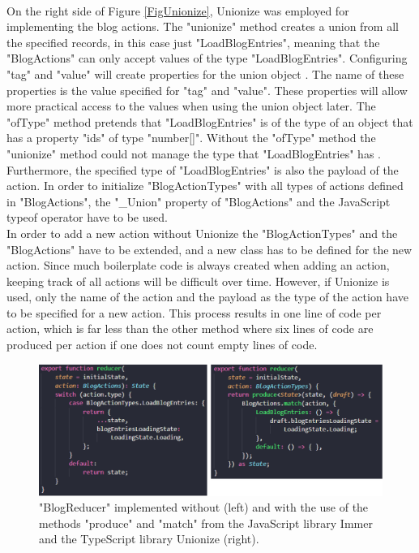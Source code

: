 \documentclass[Bachelor,BIF,english]{twbook}
\begin{document}
\\[\baselineskip]
On the right side of Figure \ref{FigUnionize}, Unionize was employed for implementing the blog actions. The "unionize" method creates a union from all the specified records, in this case just "LoadBlogEntries", meaning that the "BlogActions" can only accept values of the type "LoadBlogEntries". Configuring "tag" and "value" will create properties for the union object \cite{Unionize}. The name of these properties is the value specified for "tag" and "value". These properties will allow more practical access to the values when using the union object later. The "ofType" method pretends that "LoadBlogEntries" is of the type of an object that has a property "ids" of type "number[]". Without the "ofType" method the "unionize" method could not manage the type that "LoadBlogEntries" has \cite{Unionize}. Furthermore, the specified type of "LoadBlogEntries" is also the payload of the action. In order to initialize "BlogActionTypes" with all types of actions defined in "BlogActions", the "\_Union" property of "BlogActions" and the JavaScript typeof operator have to be used.
\\[\baselineskip]
In order to add a new action without Unionize the "BlogActionTypes" and the "BlogActions" have to be extended, and a new class has to be defined for the new action. Since much boilerplate code is always created when adding an action, keeping track of all actions will be difficult over time. However, if Unionize is used, only the name of the action and the payload as the type of the action have to be specified for a new action. This process results in one line of code per action, which is far less than the other method where six lines of code are produced per action if one does not count empty lines of code.
\begin{figure}[!htbp]
\centering
\includegraphics[width=1\linewidth]{PICs/with_and_without_immer_unionize_reducer.eps}
\caption{"BlogReducer" implemented without (left) and with the use of the methods "produce" and "match" from the JavaScript library Immer \cite{Immer} and the TypeScript library Unionize \cite{Unionize} (right).}\label{FigImmer}
\end{figure}
\end{document}
